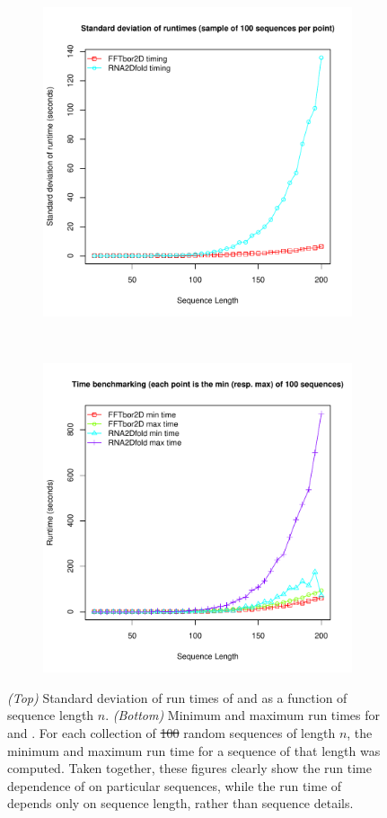\documentclass[11pt, oneside]{Thesis} %
\providecommand{\DIFadd}[1]{{\protect\color{blue}\uwave{#1}}} %
\providecommand{\DIFdel}[1]{{\protect\color{red}\sout{#1}}}                      %
\providecommand{\DIFaddFL}[1]{\DIFadd{#1}} %
\providecommand{\DIFdelFL}[1]{\DIFdel{#1}} %
\providecommand{\DIFaddbeginFL}{} %
\providecommand{\DIFaddendFL}{} %
\providecommand{\DIFdelbeginFL}{} %
\providecommand{\DIFdelendFL}{} %
\begin{document}
\begin{figure}[!ht]
\centering
\begin{subfigure}[h]{\textwidth}
\centering
\includegraphics[width=.65\textwidth]{Figures/FFTbor2D/ffttwoRtwofoldStdev.pdf}
\end{subfigure} \\
\begin{subfigure}[h]{\textwidth}
\centering
\includegraphics[width=.65\textwidth]{Figures/FFTbor2D/ffttwoRtwofoldMinMax.pdf}
\end{subfigure}
\caption[{\em (Top)}
Standard deviation of run times of \rnatwofold and \ffttwo
as a function of sequence length $n$.
{\em (Bottom)}
Minimum and maximum run times for \rnatwofold and \ffttwo]{
{\em (Top)}
Standard deviation of run times of \rnatwofold and \ffttwo
as a function of sequence length $n$.
{\em (Bottom)}
Minimum and maximum run times for \rnatwofold and \ffttwo.
For each collection of \DIFdelbeginFL \DIFdelFL{100 }\DIFdelendFL \DIFaddbeginFL \DIFaddFL{$100$ }\DIFaddendFL random sequences of length $n$, the minimum
and maximum run time for a sequence of that length was computed.
Taken together, these figures clearly show the
run time dependence of \rnatwofold on particular sequences, while
the run time of \ffttwo depends only on sequence length, rather than
sequence details.
}
\label{fig:ffttwo:ffttwoRtwofoldStdevMinMax}
\end{figure}
\end{document}
